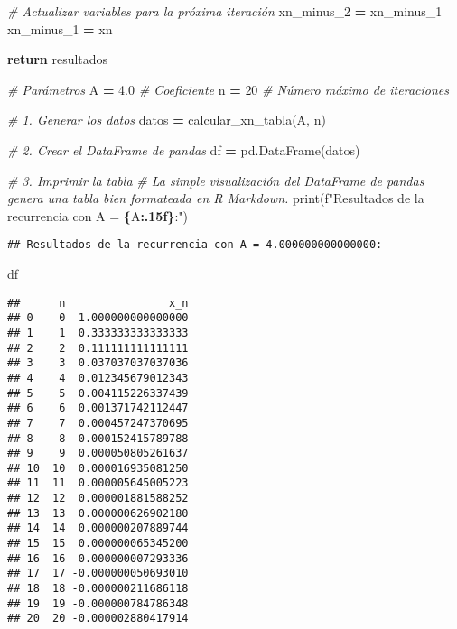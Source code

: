 \documentclass[
]{article}
\newenvironment{Shaded}{\begin{snugshade}}{\end{snugshade}}
\newcommand{\BuiltInTok}[1]{#1}
\newcommand{\CommentTok}[1]{\textcolor[rgb]{0.56,0.35,0.01}{\textit{#1}}}
\newcommand{\ControlFlowTok}[1]{\textcolor[rgb]{0.13,0.29,0.53}{\textbf{#1}}}
\newcommand{\DecValTok}[1]{\textcolor[rgb]{0.00,0.00,0.81}{#1}}
\newcommand{\FloatTok}[1]{\textcolor[rgb]{0.00,0.00,0.81}{#1}}
\newcommand{\NormalTok}[1]{#1}
\newcommand{\OperatorTok}[1]{\textcolor[rgb]{0.81,0.36,0.00}{\textbf{#1}}}
\newcommand{\SpecialCharTok}[1]{\textcolor[rgb]{0.81,0.36,0.00}{\textbf{#1}}}
\newcommand{\SpecialStringTok}[1]{\textcolor[rgb]{0.31,0.60,0.02}{#1}}
\begin{document}
\begin{Shaded}
\begin{Highlighting}[]
        \CommentTok{\# Actualizar variables para la próxima iteración}
\NormalTok{        xn\_minus\_2 }\OperatorTok{=}\NormalTok{ xn\_minus\_1}
\NormalTok{        xn\_minus\_1 }\OperatorTok{=}\NormalTok{ xn}
        
    \ControlFlowTok{return}\NormalTok{ resultados}

\CommentTok{\# Parámetros}
\NormalTok{A }\OperatorTok{=} \FloatTok{4.0}  \CommentTok{\# Coeficiente}
\NormalTok{n }\OperatorTok{=} \DecValTok{20}   \CommentTok{\# Número máximo de iteraciones}

\CommentTok{\# 1. Generar los datos}
\NormalTok{datos }\OperatorTok{=}\NormalTok{ calcular\_xn\_tabla(A, n)}

\CommentTok{\# 2. Crear el DataFrame de pandas}
\NormalTok{df }\OperatorTok{=}\NormalTok{ pd.DataFrame(datos)}

\CommentTok{\# 3. Imprimir la tabla}
\CommentTok{\# La simple visualización del DataFrame de pandas genera una tabla bien formateada en R Markdown.}
\BuiltInTok{print}\NormalTok{(}\SpecialStringTok{f"Resultados de la recurrencia con A = }\SpecialCharTok{\{}\NormalTok{A}\SpecialCharTok{:.15f\}}\SpecialStringTok{:"}\NormalTok{)}
\end{Highlighting}
\end{Shaded}

\begin{verbatim}
## Resultados de la recurrencia con A = 4.000000000000000:
\end{verbatim}

\begin{Shaded}
\begin{Highlighting}[]
\NormalTok{df}
\end{Highlighting}
\end{Shaded}

\begin{verbatim}
##      n                x_n
## 0    0  1.000000000000000
## 1    1  0.333333333333333
## 2    2  0.111111111111111
## 3    3  0.037037037037036
## 4    4  0.012345679012343
## 5    5  0.004115226337439
## 6    6  0.001371742112447
## 7    7  0.000457247370695
## 8    8  0.000152415789788
## 9    9  0.000050805261637
## 10  10  0.000016935081250
## 11  11  0.000005645005223
## 12  12  0.000001881588252
## 13  13  0.000000626902180
## 14  14  0.000000207889744
## 15  15  0.000000065345200
## 16  16  0.000000007293336
## 17  17 -0.000000050693010
## 18  18 -0.000000211686118
## 19  19 -0.000000784786348
## 20  20 -0.000002880417914
\end{verbatim}
\end{document}
